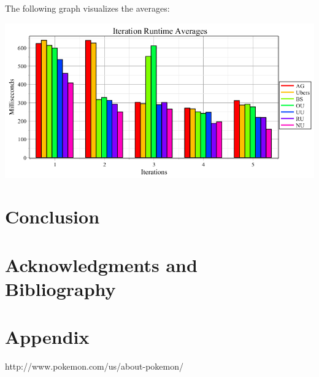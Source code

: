 \documentclass{article}
\begin{document}
The following graph visualizes the averages:
\begin{center}
	\includegraphics[width=\textwidth]{RuntimeAverages.png}
\end{center}
\section{Conclusion}

\section{Acknowledgments and Bibliography}

\section{Appendix}
http://www.pokemon.com/us/about-pokemon/
\end{document}
